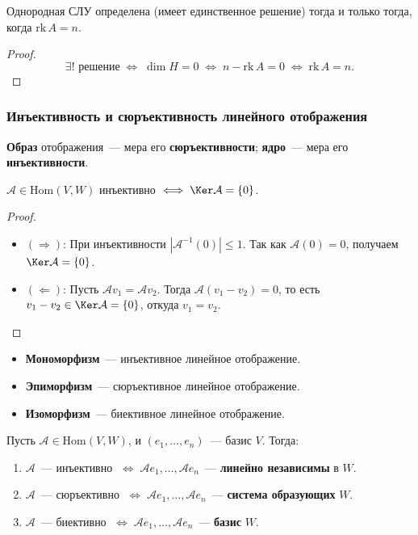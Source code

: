 \begin{Corollary}{}{}
	Однородная СЛУ определена (имеет единственное решение) тогда и только тогда, когда $\mathrm{rk}\,A = n$.
\end{Corollary}

\begin{proof}
	\[
	\exists!\text{ решение} \;\Leftrightarrow\; \dim H = 0 \;\Leftrightarrow\; n - \mathrm{rk}\,A = 0
	\;\Leftrightarrow\; \mathrm{rk}\,A = n.
	\]
\end{proof}

\subsubsection*{Инъективность и сюръективность линейного отображения}

\textbf{Образ} отображения~--- мера его \textbf{сюръективности};
\textbf{ядро}~--- мера его \textbf{инъективности}.

\begin{Proposition}{}{}
	$\mathcal{A} \in \mathrm{Hom}(V, W)$ инъективно $\;\Longleftrightarrow\; \Ker\mathcal{A} = \{0\}$.
\end{Proposition}

\begin{proof}
	\begin{itemize}
		\item $(\Rightarrow)$: При инъективности $|\mathcal{A}^{-1}(0)| \le 1$.
		Так как $\mathcal{A}(0) = 0$, получаем $\Ker\mathcal{A} = \{0\}$.
		\item $(\Leftarrow)$: Пусть $\mathcal{A}v_1 = \mathcal{A}v_2$. Тогда
		$\mathcal{A}(v_1 - v_2) = 0$, то есть $v_1 - v_2 \in \Ker\mathcal{A} = \{0\}$,
		откуда $v_1 = v_2$.
	\end{itemize}
\end{proof}

\begin{Definition}{}{}
	\begin{itemize}
		\item \textbf{Мономорфизм}~--- инъективное линейное отображение.
		\item \textbf{Эпиморфизм}~--- сюръективное линейное отображение.
		\item \textbf{Изоморфизм}~--- биективное линейное отображение.
	\end{itemize}
\end{Definition}

\begin{Proposition}{}{}
	Пусть $\mathcal{A} \in \mathrm{Hom}(V, W)$, и $(e_1, \ldots, e_n)$~--- базис $V$. Тогда:
	\begin{enumerate}
		\item $\mathcal{A}$~--- инъективно $\;\Leftrightarrow\; \mathcal{A}e_1, \ldots, \mathcal{A}e_n$~--- \textbf{линейно независимы} в $W$.
		\item $\mathcal{A}$~--- сюръективно $\;\Leftrightarrow\; \mathcal{A}e_1, \ldots, \mathcal{A}e_n$~--- \textbf{система образующих} $W$.
		\item $\mathcal{A}$~--- биективно $\;\Leftrightarrow\; \mathcal{A}e_1, \ldots, \mathcal{A}e_n$~--- \textbf{базис} $W$.
	\end{enumerate}
\end{Proposition}

